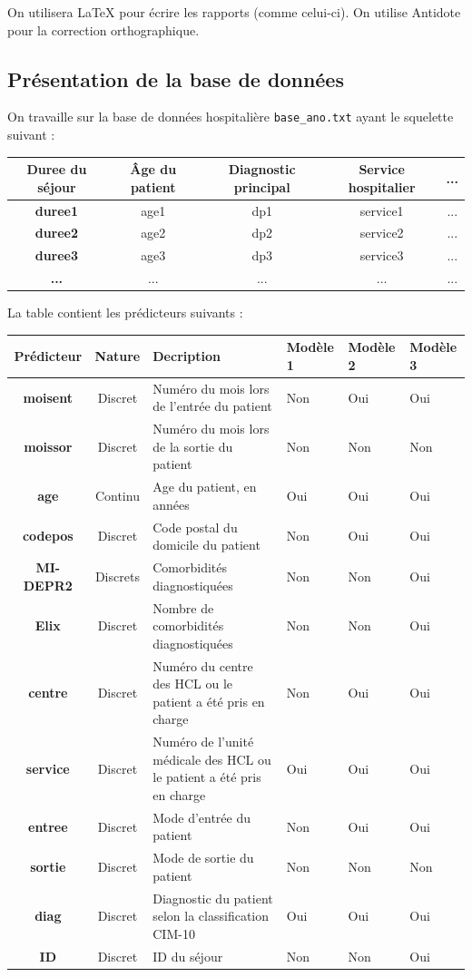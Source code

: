 \documentclass[a4paper,11pt]{article}
\begin{document}
On utilisera LaTeX pour écrire les rapports (comme celui-ci). On utilise Antidote pour la correction orthographique.
\subsection{Présentation de la base de données}
On travaille sur la base de données hospitalière \texttt{base\_ano.txt} ayant le squelette suivant :

\begin{center}
\begin{tabular}{|c|c|c|c|c|}
\hline
\textbf{Duree du séjour} & Âge du patient & Diagnostic principal & Service hospitalier & ...\\
\hline
\textbf{duree1} & age1 & dp1 & service1 & ... \\
\hline
\textbf{duree2} & age2 & dp2 & service2 & ... \\
\hline
\textbf{duree3} & age3 & dp3 & service3 & ... \\
\hline
\textbf{...} & ... & ...  & ... & ...\\
\hline
\end{tabular}
\end{center}

La table contient les prédicteurs suivants :
\begin{center}
\begin{tabularx}{\textwidth}{|c|c|X|X|X|X|}
\hline
\textbf{Prédicteur} & Nature & Decription  & Modèle 1 & Modèle 2 & Modèle 3 \\
\hline
\textbf{moisent} & Discret & Numéro du mois lors de l'entrée du patient & Non & Oui & Oui \\
\hline
\textbf{moissor} & Discret & Numéro du mois lors de la sortie du patient & Non & Non & Non\\
\hline
\textbf{age} & Continu & Age du patient, en années & Oui & Oui & Oui\\
\hline
\textbf{codepos} & Discret & Code postal du domicile du patient  & Non & Oui & Oui \\
\hline
\textbf{MI-DEPR2} & Discrets & Comorbidités diagnostiquées & Non & Non & Oui \\
\hline
\textbf{Elix} & Discret & Nombre de comorbidités diagnostiquées & Non & Non & Oui \\
\hline
\textbf{centre} & Discret & Numéro du centre des HCL ou le patient a été pris en charge & Non & Oui & Oui\\
\hline
\textbf{service} & Discret & Numéro de l'unité médicale des HCL ou le patient a été pris en charge & Oui & Oui & Oui \\
\hline
\textbf{entree} & Discret & Mode d'entrée du patient & Non & Oui & Oui \\
\hline
\textbf{sortie} & Discret & Mode de sortie du patient & Non & Non & Non\\
\hline
\textbf{diag} & Discret & Diagnostic du patient selon la classification CIM-10 & Oui & Oui & Oui\\
\hline
\textbf{ID} & Discret & ID du séjour & Non & Non & Oui \\
\hline
\end{tabularx}
\end{center}
\end{document}
